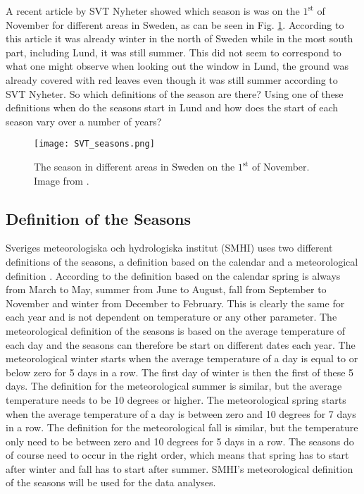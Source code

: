 

A recent article by SVT Nyheter showed which season is was on the $1^\text{st}$ of November for different areas in Sweden, as can be seen in Fig. \ref{fig:SVT}. According to this article it was already winter in the north of Sweden while in the most south part, including Lund, it was still summer. This did not seem to correspond to what one might observe when looking out the window in Lund, the ground was already covered with red leaves even though it was still summer according to SVT Nyheter. So which definitions of the season are there? Using one of these definitions when do the seasons start in Lund and how does the start of each season vary over a number of years?

\begin{figure}[h!]
\centering
\texttt{[image: SVT\_seasons.png]}
\caption{The season in different areas in Sweden on the $1^\text{st}$ of November. Image from \cite{SVT}.}
\label{fig:SVT}
\end{figure}


\subsection{Definition of the Seasons}

Sveriges meteorologiska och hydrologiska institut (SMHI) uses two different definitions of the seasons, a definition based on the calendar and a meteorological definition \cite{SMHI}. According to the definition based on the calendar spring is always from March to May, summer from June to August, fall from September to November and winter from December to February. This is clearly the same for each year and is not dependent on temperature or any other parameter. The meteorological definition of the seasons is based on the average temperature of each day and the seasons can therefore be start on different dates each year. The meteorological winter starts when the average temperature of a day is equal to or below zero for 5 days in a row. The first day of winter is then the first of these 5 days.  The definition for the meteorological summer is similar, but the average temperature needs to be 10 degrees or higher. The meteorological spring starts when the average temperature of a day is between zero and 10 degrees for 7 days in a row. The definition for the meteorological fall is similar, but the temperature only need to be between zero and 10 degrees for 5 days in a row. The seasons do of course need to occur in the right order, which means that spring has to start after winter and fall has to start after summer. SMHI's meteorological definition of the seasons will be used for the data analyses. 

